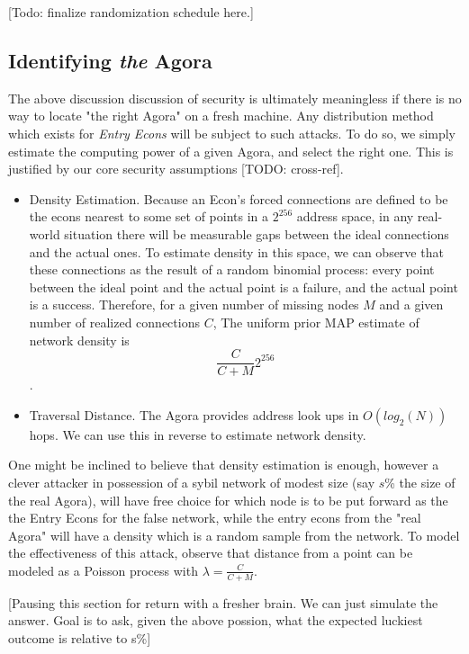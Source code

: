 \documentclass{article}
\begin{document}
[Todo: finalize randomization schedule here.]

\subsection{Identifying \emph{the} Agora}

The above discussion discussion of security is ultimately meaningless if there is no way to locate "the right Agora" on a fresh machine. Any distribution method which exists for \emph{Entry Econs} will be subject to such attacks. To do so, we simply estimate the computing power of a given Agora, and select the right one. This is justified by our core security assumptions [TODO: cross-ref].

\begin{itemize}
    \item Density Estimation. Because an Econ's forced connections are defined to be the econs nearest to some set of points in a $2^{256}$ address space, in any real-world situation there will be measurable gaps between the ideal connections and the actual ones. To estimate density in this space, we can observe that these connections as the result of a random binomial process: every point between the ideal point and the actual point is a failure, and the actual point is a success. Therefore, for a given number of missing nodes $M$ and a given number of realized connections $C$, The uniform prior MAP estimate of network density is $$\frac{C}{C + M} 2^{256}$$.
    \item Traversal Distance. The Agora provides address look ups in $O(log_2(N))$ hops. We can use this in reverse to estimate network density.
\end{itemize}

One might be inclined to believe that density estimation is enough, however a clever attacker in possession of a sybil network of modest size (say $s$\% the size of the real Agora), will have free choice for which node is to be put forward as the the Entry Econs for the false network, while the entry econs from the "real Agora" will have a density which is a random sample from the network. To model the effectiveness of this attack, observe that distance from a point can be modeled as a Poisson process with $\lambda = \frac{C}{C+M}$.

[Pausing this section for return with a fresher brain. We can just simulate the answer. Goal is to ask, given the above possion, what the expected luckiest outcome is relative to s\%]
\end{document}
